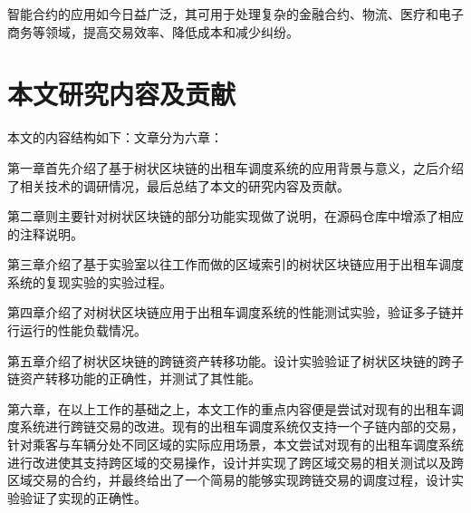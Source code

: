 智能合约的应用如今日益广泛，其可用于处理复杂的金融合约、物流、医疗和电子商务等领域，提高交易效率、降低成本和减少纠纷\cite{ouyang2019}。 

\section{本文研究内容及贡献}

本文的内容结构如下：文章分为六章：

第一章首先介绍了基于树状区块链的出租车调度系统的应用背景与意义，之后介绍了相关技术的调研情况，最后总结了本文的研究内容及贡献。

第二章则主要针对树状区块链的部分功能实现做了说明，在源码仓库中增添了相应的注释说明。

第三章介绍了基于实验室以往工作而做的区域索引的树状区块链应用于出租车调度系统的复现实验的实验过程。

第四章介绍了对树状区块链应用于出租车调度系统的性能测试实验，验证多子链并行运行的性能负载情况。

第五章介绍了树状区块链的跨链资产转移功能。设计实验验证了树状区块链的跨子链资产转移功能的正确性，并测试了其性能。

第六章，在以上工作的基础之上，本文工作的重点内容便是尝试对现有的出租车调度系统进行跨链交易的改进。现有的出租车调度系统仅支持一个子链内部的交易，针对乘客与车辆分处不同区域的实际应用场景，本文尝试对现有的出租车调度系统进行改进使其支持跨区域的交易操作，设计并实现了跨区域交易的相关测试以及跨区域交易的合约，并最终给出了一个简易的能够实现跨链交易的调度过程，设计实验验证了实现的正确性。



